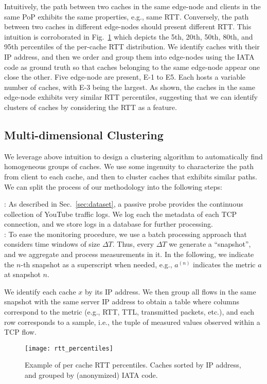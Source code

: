 \documentclass{acm_proc_article-sp}
\newcommand{\node}{{edge-node}\xspace}
\newcommand{\nodes}{{edge-nodes}\xspace}
\begin{document}
Intuitively, the path between two caches in the same \node and clients in the same PoP
exhibits the same properties, e.g., same RTT. Conversely, the path between two caches in different \nodes should present different RTT. This intuition is corroborated in Fig.~\ref{fig:perc1} which depicts the 5th, 20th, 50th, 80th, and 95th percentiles of the per-cache RTT distribution. We identify caches with their IP address, and then we order and group them into \nodes using the IATA code as ground truth so that caches belonging to the same \node appear one close the other. Five \node are present, E-1 to E5. Each hosts a variable number of caches, with E-3 being the largest.
As shown, the caches in the same \node exhibits very similar RTT percentiles, suggesting that we can identify clusters of caches by considering the RTT as a feature.



\subsection{Multi-dimensional Clustering}
\label{sec:clust}

We leverage above intuition to design a clustering algorithm to automatically find homogeneous groups of caches.
We use some ingenuity to characterize the path from client to each cache, and then to cluster caches that exhibits similar paths.
We can split the process of our methodology into the following steps:

:
As described in Sec.~\ref{sec:dataset}, a passive probe provides the continuous collection of YouTube traffic logs. We log each the metadata of each TCP connection, and we store logs in a database for further processing.
\\
:
To ease the monitoring procedure, we use a batch processing approach that considers time windows of size $\Delta T$. Thus, every $\Delta T$ we generate a ``snapshot'', and we aggregate and process measurements in it. In the following, we indicate the $n$-th snapshot as a superscript when needed, e.g., $a^{(n)}$ indicates the metric $a$ at snapshot $n$.

We identify each cache $x$ by its IP address. We then group all flows in the same snapshot with the same server IP address to obtain a table where columns correspond to the metric (e.g., RTT, TTL, transmitted packets, etc.),
and each row corresponds to a sample, i.e., the tuple of measured values observed within a TCP flow.
\begin{figure}[t!]
\centering
     \vspace*{-0.1cm}
    \texttt{[image: rtt\_percentiles]}
     \vspace*{-0.5cm}
    \caption{Example of per cache RTT percentiles. Caches sorted by IP address, and grouped by (anonymized) IATA code.}
    \label{fig:perc1}
     \vspace*{-0.3cm}
\end{figure}
\end{document}
